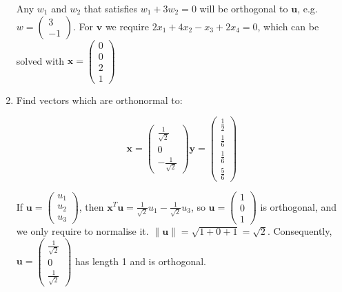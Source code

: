 \documentclass{article}
\begin{document}
\begin{enumerate}
Any $w_{1}$ and $w_{2}$ that satisfies $w_{1}+3w_{2}=0$ will be orthogonal to $\boldsymbol{u}$, e.g. $w = \left( \begin{array}{r} 3 \\ -1 \end{array} \right)$.   For $\boldsymbol{v}$ we require $2x_{1} + 4x_{2} - x_{3} + 2x_{4}=0$, which can be solved with $\boldsymbol{x} = \left( \begin{array}{r} 0 \\ 0 \\ 2 \\ 1 \end{array} \right)$

\item Find vectors which are orthonormal to:


\begin{displaymath}
\boldsymbol{x} =  \left( \begin{array}{r} \frac{1}{\sqrt{2}} \\ 0 \\ -\frac{1}{\sqrt{2}} \end{array} \right)
\boldsymbol{y} = \left( \begin{array}{r} \frac{1}{2} \\ \frac{1}{6} \\ \frac{1}{6} \\ \frac{5}{6} \end{array} \right)
\end{displaymath}

If $\boldsymbol{u} = \left( \begin{array}{r}u_{1} \\ u_{2} \\u_{3} \end{array} \right)$, then $\boldsymbol{x}^{T}\boldsymbol{u} = \frac{1}{\sqrt{2}}u_{1}-\frac{1}{\sqrt{2}}u_{3}$, so $\boldsymbol{u} = \left( \begin{array}{r} 1 \\ 0 \\1 \end{array} \right)$ is orthogonal, and we only require to normalise it.   $\lVert \boldsymbol{u} \rVert = \sqrt{1 + 0 + 1} = \sqrt{2}$.   Consequently, $\boldsymbol{u} = \left( \begin{array}{r} \frac{1}{\sqrt{2}} \\ 0 \\ \frac{1}{\sqrt{2}} \end{array} \right)$ has length 1 and is orthogonal.


\end{enumerate}
\end{document}
